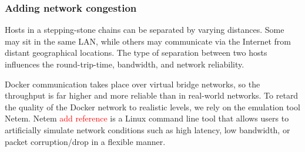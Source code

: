\documentclass[runningheads]{llncs}\usepackage[]{graphicx}\usepackage[]{color}
\begin{document}



\subsubsection{Adding network congestion}\label{Sec:congestion}

Hosts in a stepping-stone chains can be separated by varying distances. Some may sit in the same LAN, while others may communicate via the Internet from distant geographical locations. The type of separation between two hosts influences the round-trip-time, bandwidth, and network reliability. 

Docker communication takes place over virtual bridge networks, so the throughput is far higher and more reliable than in real-world networks. %
To retard the quality of the Docker network to realistic levels, we rely on the emulation tool Netem. Netem \textcolor{red}{add reference} is a Linux command line tool that allows users to artificially simulate network conditions such as high latency, low bandwidth, or packet corruption/drop in a flexible manner.
\end{document}
